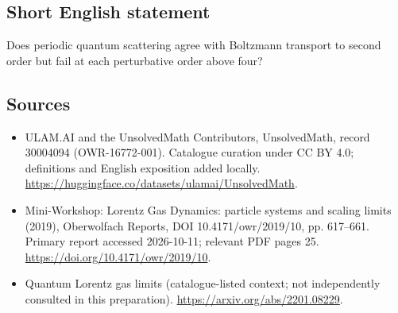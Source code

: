\documentclass[11pt]{article}
\begin{document}
\subsection{Short English statement}
Does periodic quantum scattering agree with Boltzmann transport to second order but fail at each perturbative order above four?
\subsection{Sources}
\begin{itemize}
\item[\hypertarget{source:30004094:1}{S1}] ULAM.AI and the UnsolvedMath Contributors, UnsolvedMath, record 30004094 (OWR-16772-001). Catalogue curation under CC BY 4.0; definitions and English exposition added locally.
\url{https://huggingface.co/datasets/ulamai/UnsolvedMath}.
\item[\hypertarget{source:30004094:2}{S2}] Mini-Workshop: Lorentz Gas Dynamics: particle systems and scaling limits (2019), Oberwolfach Reports, DOI 10.4171/owr/2019/10, pp. 617--661. Primary report accessed 2026-10-11; relevant PDF pages 25.
\url{https://doi.org/10.4171/owr/2019/10}.
\item[\hypertarget{source:30004094:3}{S3}] Quantum Lorentz gas limits (catalogue-listed context; not independently consulted in this preparation).
\url{https://arxiv.org/abs/2201.08229}.
\end{itemize}
\label{end:30004094}
\end{document}
